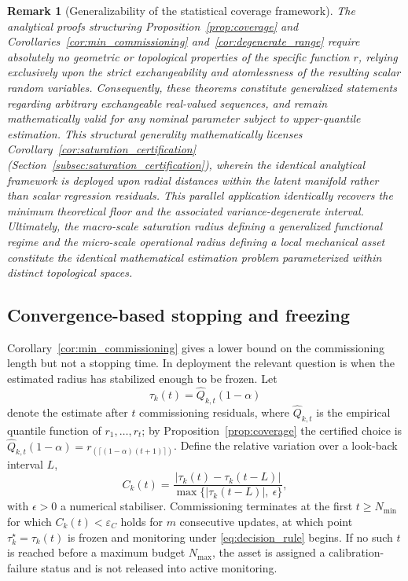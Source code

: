 \documentclass[a4paper]{cas-sc}
\newtheorem{remark}{Remark}
\newcommand{\residual}{\ensuremath{r}}
\begin{document}
\begin{remark}[Generalizability of the statistical coverage framework]
\label{rem:saturation_link}
The analytical proofs structuring Proposition~\ref{prop:coverage} and Corollaries~\ref{cor:min_commissioning} and~\ref{cor:degenerate_range} require absolutely no geometric or topological properties of the specific function \(\residual\), relying exclusively upon the strict exchangeability and atomlessness of the resulting scalar random variables. Consequently, these theorems constitute generalized statements regarding arbitrary exchangeable real-valued sequences, and remain mathematically valid for any nominal parameter subject to upper-quantile estimation. This structural generality mathematically licenses Corollary~\ref{cor:saturation_certification} (Section~\ref{subsec:saturation_certification}), wherein the identical analytical framework is deployed upon radial distances within the latent manifold rather than scalar regression residuals. This parallel application identically recovers the minimum theoretical floor and the associated variance-degenerate interval. Ultimately, the macro-scale saturation radius defining a generalized functional regime and the micro-scale operational radius defining a local mechanical asset constitute the identical mathematical estimation problem parameterized within distinct topological spaces.
\end{remark}

\subsection{Convergence-based stopping and freezing}
\label{subsec:stopping}

Corollary~\ref{cor:min_commissioning} gives a lower bound on the
commissioning length but not a stopping time. In deployment the relevant
question is when the estimated radius has stabilized enough to be frozen.
Let
\begin{equation}
\tau_k(t) = \widehat{Q}_{k,t}(1-\alpha)
\label{eq:tau_online}
\end{equation}
denote the estimate after \(t\) commissioning residuals, where
\(\widehat{Q}_{k,t}\) is the empirical quantile function of
\(\residual_1,\ldots,\residual_t\); by
Proposition~\ref{prop:coverage} the certified choice is
\(\widehat{Q}_{k,t}(1-\alpha)=\residual_{(\lceil(1-\alpha)(t+1)\rceil)}\).
Define the relative variation over a look-back interval \(L\),
\begin{equation}
C_k(t)
=
\frac{\bigl|\tau_k(t)-\tau_k(t-L)\bigr|}
     {\max\bigl\{\bigl|\tau_k(t-L)\bigr|,\ \epsilon\bigr\}},
\label{eq:convergence}
\end{equation}
with \(\epsilon>0\) a numerical stabiliser. Commissioning terminates at the
first \(t\ge N_{\min}\) for which \(C_k(t)<\varepsilon_C\) holds for \(m\)
consecutive updates, at which point \(\tau_k^\star = \tau_k(t)\) is frozen
and monitoring under \eqref{eq:decision_rule} begins. If no such \(t\) is
reached before a maximum budget \(N_{\max}\), the asset is assigned a
calibration-failure status and is not released into active monitoring.
\end{document}
